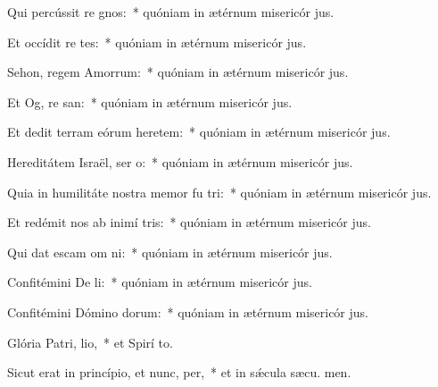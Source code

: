 \item Qui percússit re gnos:~* quóniam in ætérnum misericór jus.
\item Et occídit re tes:~* quóniam in ætérnum misericór jus.
\item Sehon, regem Amorrum:~* quóniam in ætérnum misericór jus.
\item Et Og, re san:~* quóniam in ætérnum misericór jus.
\item Et dedit terram eórum heretem:~* quóniam in ætérnum misericór jus.
\item Hereditátem Israël, ser o:~* quóniam in ætérnum misericór jus.
\item Quia in humilitáte nostra memor fu tri:~* quóniam in ætérnum misericór jus.
\item Et redémit nos ab inimí tris:~* quóniam in ætérnum misericór jus.
\item Qui dat escam om ni:~* quóniam in ætérnum misericór jus.
\item Confitémini De li:~* quóniam in ætérnum misericór jus.
\item Confitémini Dómino dorum:~* quóniam in ætérnum misericór jus.
\item Glória Patri,  lio,~* et Spirí to.
\item Sicut erat in princípio, et nunc,  per,~* et in sǽcula sæcu. men.
